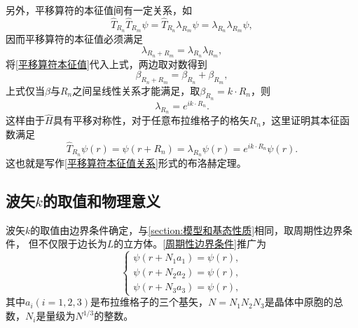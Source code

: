             另外，平移算符的本征值间有一定关系，如
            \begin{equation}
                \hat{T}_{R_n}\hat{T}_{R_m}\psi=\hat{T}_{R_n}\lambda_{R_m}\psi=\lambda_{R_n}\lambda_{R_m}\psi,
            \end{equation}
            因而平移算符的本征值必须满足
            \begin{equation}
                \lambda_{R_n+R_m}=\lambda_{R_n}\lambda_{R_m}\label{平移算符本征值关系},
            \end{equation}
            将\autoref{平移算符本征值}代入上式，两边取对数得到
            \begin{equation}
                \beta_{R_n+R_m}=\beta_{R_n}+\beta_{R_m},
            \end{equation}
            上式仅当$\beta$与$R_n$之间呈线性关系才能满足，取$\beta_{R_n}=k\cdot R_{n}$，则
            \begin{equation}
                \lambda_{R_n}=e^{ik\cdot R_n}.
            \end{equation}
            这样由于$\hat{H}$具有平移对称性，对于任意布拉维格子的格矢$R_n$，这里证明其本征函数满足
            \begin{equation}
                \hat{T}_{R_n}\psi(r)=\psi(r+R_n)=\lambda_{R_n}\psi(r)=e^{ik\cdot R_n}\psi(r).
            \end{equation}
            这也就是写作\autoref{平移算符本征值关系}形式的布洛赫定理。

        \subsection{波矢$k$的取值和物理意义}\label{subsection:波矢k的取值和物理意义}
            波矢$k$的取值由边界条件确定，与\autoref{section:模型和基态性质}相同，取周期性边界条件，
            但不仅限于边长为$L$的立方体。\autoref{周期性边界条件}推广为
            \begin{equation}
                \left\{
                    \begin{split}
                        \psi(r+N_1a_1)=\psi(r),\\
                        \psi(r+N_2a_2)=\psi(r),\\
                        \psi(r+N_3a_3)=\psi(r),
                    \end{split}\label{推广的周期性边界条件}\right.
            \end{equation}
            其中$a_i(i=1,2,3)$是布拉维格子的三个基矢，$N=N_1N_2N_3$是晶体中原胞的总数，$N_i$是量级为$N^{1/3}$的整数。

